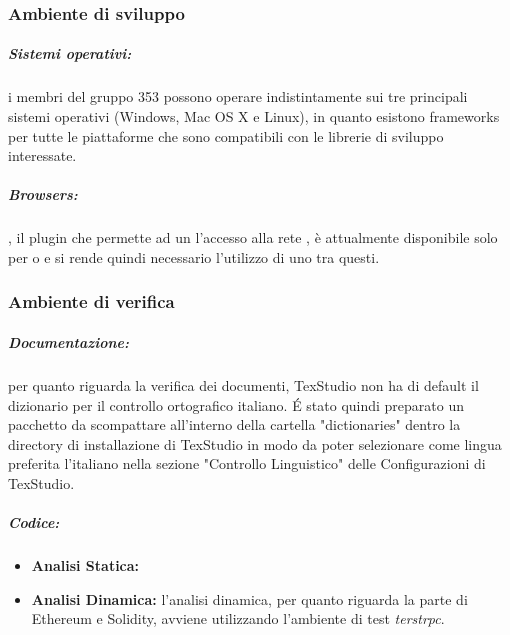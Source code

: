 	\subsubsection{Ambiente di sviluppo}
	\subparagraph{Sistemi operativi:} i membri del gruppo 353 possono operare indistintamente sui tre principali sistemi operativi (Windows, Mac OS X e Linux), in quanto esistono frameworks per tutte le piattaforme che sono compatibili con le librerie di sviluppo interessate.
	\subparagraph{Browsers:} , il plugin che permette ad un  l'accesso alla rete , è attualmente disponibile solo per  o  e si rende quindi necessario l'utilizzo di uno tra questi.
	\subsubsection{Ambiente di verifica}
	\subparagraph{Documentazione:} per quanto riguarda la verifica dei documenti, TexStudio non
		ha di default il dizionario per il controllo ortografico italiano. \'{E}
		stato quindi preparato un pacchetto da scompattare all'interno della cartella
		"dictionaries" dentro la directory di installazione di TexStudio in modo da
		poter selezionare come lingua preferita l'italiano nella sezione "Controllo
		Linguistico" delle Configurazioni di TexStudio.
	\subparagraph{Codice:}
		\begin{itemize}
			\item \textbf{Analisi Statica:} %
			\item \textbf{Analisi Dinamica:} l'analisi dinamica, per quanto riguarda la parte di Ethereum e Solidity, avviene utilizzando l'ambiente di test \emph{terstrpc}.
		\end{itemize}